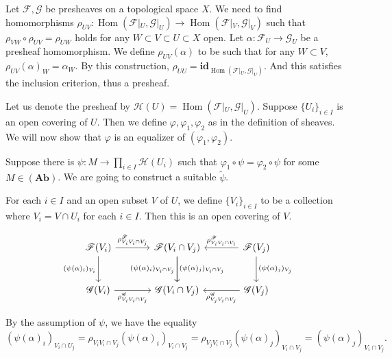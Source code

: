 \documentclass{article}
\DeclareMathOperator{\Hom}{Hom}
\begin{document}
\par Let $\mathcal{F},\mathcal{G}$ be presheaves on a topological space $X$. We need to find homomorphisms $\rho_{UV}:\Hom(\mathcal{F}|_U,\mathcal{G}|_U)\to\Hom(\mathcal{F}|_V,\mathcal{G}|_V)$ such that $\rho_{VW}\circ\rho_{UV}=\rho_{UW}$ holds
for any $W\subset V\subset U\subset X$ open. Let $\alpha:\mathcal{F}_U\to\mathcal{G}_U$ be a presheaf homomorphism. We define $\rho_{UV}(\alpha)$ to be such that for any $W\subset V$, $\rho_{UV}(\alpha)_W = \alpha_W$. By this construction, $\rho_{UU}=\mathbf{id}_{\Hom(\mathcal{F}|_U,\mathcal{G}|_U)}$. And this satisfies the inclusion criterion, thus a presheaf. 
\\
\par Let us denote the presheaf by $\mathcal{H}(U) = \Hom(\mathcal{F}|_U,\mathcal{G}|_U)$. Suppose $\{U_i\}_{i\in I}$ is an open covering of $U$. Then we define $\varphi,\varphi_1,\varphi_2$ as in the definition of sheaves. We will now show that $\varphi$ is an equalizer of $(\varphi_1,\varphi_2)$. \\
\par Suppose there is $\psi:M\to\prod_{i\in I}\mathcal{H}(U_i)$ such that $\varphi_1\circ\psi = \varphi_2\circ\psi$ for some $M\in(\mathbf{Ab})$. We are going to construct a suitable $\tilde{\psi}$.\\

\par For each $i\in I$ and an open subset $V$ of $U$, we define $\{V_i\}_{i\in I}$ to be a collection where $V_i=V\cap U_i$ for each $i\in I$. Then this is an open covering of $V$. 

\[ \begin{tikzcd}[row sep=large, column sep=large]
\mathcal{F}(V_i) \arrow{r}{\rho^{\mathcal{F}}_{V_iV_i\cap V_j}} \arrow[swap]{d}{(\psi(\alpha)_i)_{V_i}} & \mathcal{F}(V_i\cap V_j) \arrow{d}[swap]{(\psi(\alpha)_i)_{V_i\cap V_j}} \arrow{d}{(\psi(\alpha)_j)_{V_i\cap V_j}}&\arrow{l}[swap]{\rho^{\mathcal{F}}_{V_iV_i\cap V_i}} \mathcal{F}(V_j)\arrow{d}{(\psi(\alpha)_j)_{V_j}}\\
\mathcal{G}(V_i) \arrow{r}[swap]{\rho^{\mathcal{G}}_{V_iV_i\cap V_j}} & \mathcal{G}(V_i\cap V_j)&\arrow{l}{\rho^{\mathcal{G}}_{V_jV_i\cap V_j}} \mathcal{G}(V_j)
\end{tikzcd}
\]

By the assumption of $\psi$, we have the equality
\begin{equation*}
(\psi(\alpha)_i)_{V_i\cap U_j} = \rho_{V_iV_i\cap V_j}(\psi(\alpha)_i)_{V_i\cap V_j}=\rho_{V_jV_i\cap V_j}(\psi(\alpha)_j)_{V_i\cap V_j}=(\psi(\alpha)_j)_{V_i\cap V_j}.
\end{equation*}
\end{document}
